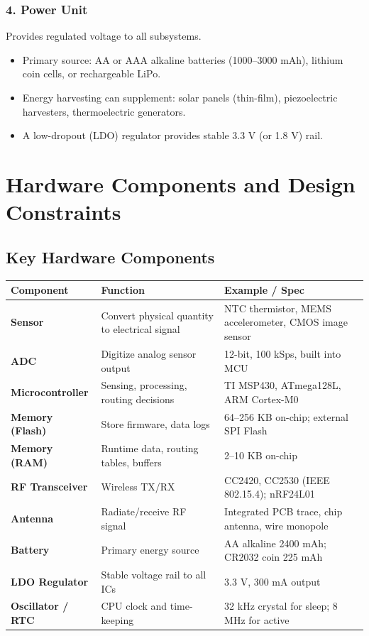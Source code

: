 \documentclass[12pt,a4paper]{article}
\renewcommand{\arraystretch}{1.45}
\begin{document}
\subsubsection*{4. Power Unit}
Provides regulated voltage to all subsystems.
\begin{itemize}[leftmargin=*, itemsep=2pt]
  \item Primary source: AA or AAA alkaline batteries (1000--3000 mAh), lithium coin cells, or rechargeable LiPo.
  \item Energy harvesting can supplement: solar panels (thin-film), piezoelectric harvesters, thermoelectric generators.
  \item A low-dropout (LDO) regulator provides stable 3.3 V (or 1.8 V) rail.
\end{itemize}

\section{Hardware Components and Design Constraints}

\subsection{Key Hardware Components}

\par\noindent
{\renewcommand{\arraystretch}{1.5}%
\begin{tabularx}{\linewidth}{|B{3.0cm}|Y|Y|}
\hline
\textbf{Component} & \textbf{Function} & \textbf{Example / Spec} \\
\hline
\textbf{Sensor} & Convert physical quantity to electrical signal & NTC thermistor, MEMS accelerometer, CMOS image sensor \\
\hline
\textbf{ADC} & Digitize analog sensor output & 12-bit, 100 kSps, built into MCU \\
\hline
\textbf{Microcontroller} & Sensing, processing, routing decisions & TI MSP430, ATmega128L, ARM Cortex-M0 \\
\hline
\textbf{Memory (Flash)} & Store firmware, data logs & 64--256 KB on-chip; external SPI Flash \\
\hline
\textbf{Memory (RAM)} & Runtime data, routing tables, buffers & 2--10 KB on-chip \\
\hline
\textbf{RF Transceiver} & Wireless TX/RX & CC2420, CC2530 (IEEE 802.15.4); nRF24L01 \\
\hline
\textbf{Antenna} & Radiate/receive RF signal & Integrated PCB trace, chip antenna, wire monopole \\
\hline
\textbf{Battery} & Primary energy source & AA alkaline 2400 mAh; CR2032 coin 225 mAh \\
\hline
\textbf{LDO Regulator} & Stable voltage rail to all ICs & 3.3 V, 300 mA output \\
\hline
\textbf{Oscillator / RTC} & CPU clock and time-keeping & 32 kHz crystal for sleep; 8 MHz for active \\
\hline
\end{tabularx}}
\end{document}
